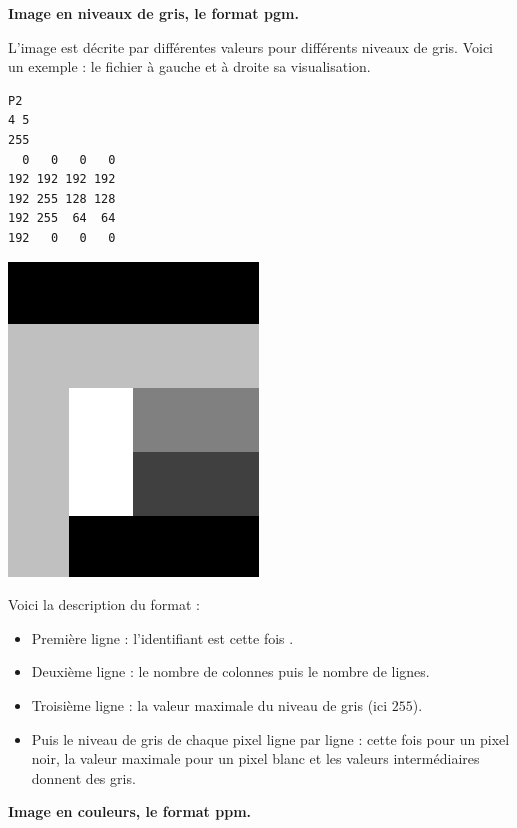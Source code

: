 \documentclass[11pt,class=report,crop=false]{standalone}
\begin{document}
\begin{cours}
\medskip

\textbf{Image en niveaux de gris, le format \og{}pgm\fg{}.}

L'image est décrite par différentes valeurs pour différents niveaux de gris.
Voici un exemple : le fichier  à gauche et à droite sa visualisation.
\begin{center}
\begin{minipage}{0.3\textwidth}
\begin{lstlisting}
P2
4 5
255
  0   0   0   0
192 192 192 192
192 255 128 128
192 255  64  64
192   0   0   0
\end{lstlisting}
\end{minipage}
\begin{minipage}{0.3\textwidth}
\includegraphics[scale=\myscale,scale=0.2]{ecran-cours-image_gris}
\end{minipage}
\end{center}

Voici la description du format :
\begin{itemize}
  \item Première ligne : l'identifiant est cette fois .
  \item Deuxième ligne : le nombre de colonnes puis le nombre de lignes.
  \item Troisième ligne : la valeur maximale du niveau de gris (ici $255$).
  \item Puis le niveau de gris de chaque pixel ligne par ligne : cette fois  pour un pixel noir, la valeur maximale pour un pixel blanc et les valeurs intermédiaires donnent des gris. 
\end{itemize}  

\medskip

\textbf{Image en couleurs, le format \og{}ppm\fg{}.}



\end{cours}
\end{document}
